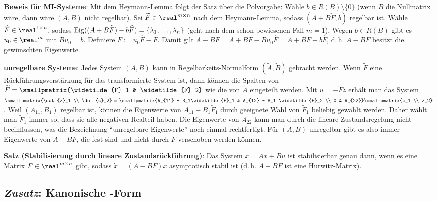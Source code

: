 \linie

\textbf{Beweis für MI-Systeme}:
Mit dem Heymann-Lemma folgt der Satz über die Polvorgabe:
Wähle $b \in R(B) \setminus \{0\}$
(wenn $B$ die Nullmatrix wäre, dann wäre $(A, B)$ nicht regelbar).
Sei $\widetilde{F} \in \real^{m \times n}$ nach dem Heymann-Lemma, sodass
$(A + B\widetilde{F}, b)$ regelbar ist.
Wähle $\widehat{F} \in \real^{1 \times n}$, sodass
$\operatorname{Eig}((A + B\widetilde{F}) - b\widehat{F}) = \{\lambda_1, \dotsc, \lambda_n\}$
(geht nach dem schon bewiesenen Fall $m = 1$).
Wegen $b \in R(B)$ gibt es $u_0 \in \real^m$ mit $Bu_0 = b$.
Definiere $F := u_0 \widehat{F} - \widetilde{F}$.
Damit gilt $A - BF = A + B\widetilde{F} - Bu_0\widehat{F}
= A + B\widetilde{F} - b\widehat{F}$,
d.\,h. $A - BF$ besitzt die gewünschten Eigenwerte.

\linie

\textbf{unregelbare Systeme}:
Jedes System $(A, B)$ kann in Regelbarkeits-Normalform
$(\widetilde{A}, \widetilde{B})$ gebracht werden.
Wenn $\widetilde{F}$ eine Rückführungsverstärkung für das transformierte System ist,
dann können die Spalten von $\widetilde{F} = \smallpmatrix{\widetilde{F}_1 & \widetilde{F}_2}$
wie die von $\widetilde{A}$ eingeteilt werden.
Mit $u = -\widetilde{F}z$ erhält man das System
$\smallpmatrix{\dot{z}_1 \\ \dot{z}_2} = \smallpmatrix{A_{11} - B_1\widetilde{F}_1 &
A_{12} - B_1 \widetilde{F}_2 \\ 0 & A_{22}} \smallpmatrix{z_1 \\ z_2}$.
Weil $(A_{11}, B_1)$ regelbar ist, können die Eigenwerte von $A_{11} - B_1\widetilde{F}_1$
durch geeignete Wahl von $\widetilde{F}_1$ beliebig gewählt werden.
Daher wählt man $\widetilde{F}_1$ immer so, dass sie alle negativen Realteil haben.
Die Eigenwerte von $A_{22}$ kann man durch die lineare Zustandsregelung nicht beeinflussen,
was die Bezeichnung "`unregelbare Eigenwerte"' noch einmal rechtfertigt.
Für $(A, B)$ unregelbar gibt es also immer Eigenwerte von $A - BF$, die fest sind
und nicht durch $F$ verschoben werden können.

\linie

\textbf{Satz (Stabilisierung durch lineare Zustandsrückführung)}:
Das System $\dot{x} = Ax + Bu$ ist stabilisierbar genau dann, wenn
es eine Matrix $F \in \real^{m \times n}$ gibt, sodass $\dot{x} = (A - BF)x$
asymptotisch stabil ist (d.\,h. $A - BF$ ist eine Hurwitz-Matrix).

\subsection{%
    \emph{Zusatz}: Kanonische -Form%
}

